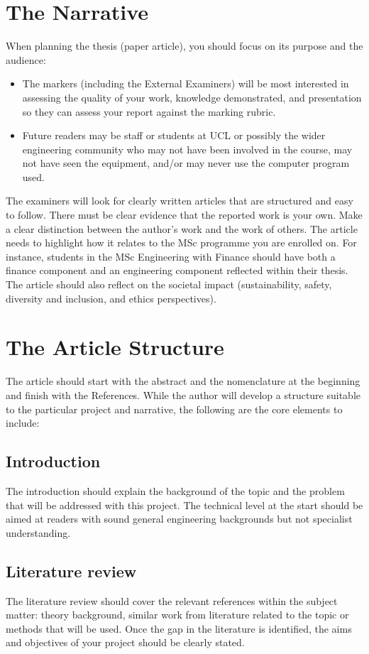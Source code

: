 \documentclass[11pt,a4paper]{article}
\begin{document}
\section{The Narrative}
When planning the thesis (paper article), you should focus on its purpose and the audience:
\begin{itemize}
    \item The markers (including the External Examiners) will be most interested in assessing the quality of your work, knowledge demonstrated, and presentation so they can assess your report against the marking rubric.
    \item Future readers may be staff or students at UCL or possibly the wider engineering community who may not have been involved in the course, may not have seen the equipment, and/or may never use the computer program used.
\end{itemize}
The examiners will look for clearly written articles that are structured and easy to follow. There must be clear evidence that the reported work is your own. Make a clear distinction between the author's work and the work of others. The article needs to highlight how it relates to the MSc programme you are enrolled on. For instance, students in the MSc Engineering with Finance should have both a finance component and an engineering component reflected within their thesis. The article should also reflect on the societal impact (sustainability, safety, diversity and inclusion, and ethics perspectives).

\section{The Article Structure}
The article should start with the abstract and the nomenclature at the beginning and finish with the References. While the author will develop a structure suitable to the particular project and narrative, the following are the core elements to include:
\subsection{Introduction}
The introduction should explain the background of the topic and the problem that will be addressed with this project. The technical level at the start should be aimed at readers with sound general engineering backgrounds but not specialist understanding.
\subsection{Literature review}
The literature review should cover the relevant references within the subject matter: theory background, similar work from literature related to the topic or methods that will be used. Once the gap in the literature is identified, the aims and objectives of your project should be clearly stated.
\end{document}
